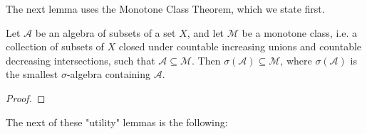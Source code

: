 The next lemma uses the Monotone Class Theorem, which we state first.

\begin{theorem}
    \label{thrm:monotone-class-theorem}
    \leanok
    Let $\mathcal{A}$ be an algebra of subsets of a set $X$, and let $\mathcal{M}$ be a monotone class, i.e. a collection of subsets of $X$ closed under countable increasing unions and countable decreasing intersections, such that $\mathcal{A} \subseteq \mathcal{M}$. Then $\sigma(\mathcal{A}) \subseteq \mathcal{M}$, where $\sigma(\mathcal{A})$ is the smallest $\sigma$-algebra containing $\mathcal{A}$.
\end{theorem}
\begin{proof}
\leanok
\end{proof}

The next of these "utility" lemmas is the following:

